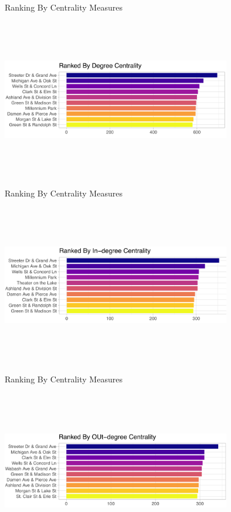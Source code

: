 \documentclass[11pt, xcolor=dvipsnames]{beamer}
\begin{document}
\begin{frame}{Ranking By Centrality Measures}
	
	\centering
	\includegraphics[width=10cm, height=7cm]{images/degree-ranking}
	
\end{frame}

\begin{frame}{Ranking By Centrality Measures}
	
	\centering
	\includegraphics[width=10cm, height=7cm]{images/indegree-ranking}
	
\end{frame}

\begin{frame}{Ranking By Centrality Measures}
	
	\centering
	\includegraphics[width=10cm, height=7cm]{images/outdegree-ranking}
	
\end{frame}
\end{document}
